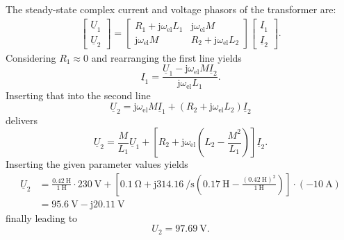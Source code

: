 \begin{solutionblock}
    The steady-state complex current and voltage phasors of the transformer are:
    \begin{align*}
			 \begin{bmatrix} \underline{U}_1 \\ \underline{U}_2 \end{bmatrix} =  \begin{bmatrix} R_1 + \mathrm{j} \omega_\mathrm{el} L_1 & \mathrm{j} \omega_\mathrm{el} M \\ \mathrm{j} \omega_\mathrm{el} M & R_2 + \mathrm{j}\omega_\mathrm{el} L_2 \end{bmatrix} \begin{bmatrix} \underline{I}_1 \\ \underline{I}_2 \end{bmatrix}.
		\end{align*}
    Considering $R_1\approx 0$ and rearranging the first line yields
    $$
    \underline{I}_1 = \frac{\underline{U}_1 - \mathrm{j} \omega_\mathrm{el} M \underline{I}_2}{\mathrm{j} \omega_\mathrm{el} L_1}. 
    $$
    Inserting that into the second line
    $$
    \underline{U}_2 = \mathrm{j} \omega_\mathrm{el} M \underline{I}_1 + (R_2 + \mathrm{j}\omega_\mathrm{el} L_2)\underline{I}_2 
    $$
    delivers
    $$
    \underline{U}_2 = \frac{M}{L_1}\underline{U}_1 + \left[R_2 + \mathrm{j}\omega_\mathrm{el}\left( L_2-\frac{M^2}{L_1}\right)\right]\underline{I}_2.
    $$
    Inserting the given parameter values yields
    \begin{align*}
    \underline{U}_2 &= \frac{\SI{0.42}{\henry}}{\SI{1}{\henry}}\cdot\SI{230}{\volt} + \left[\SI{0.1}{\ohm} + \mathrm{j}\SI{314.16}{\per\second}\left( \SI{0.17}{\henry}-\frac{(\SI{0.42}{\henry})^2}{\SI{1}{\henry}}\right)\right]\cdot(\SI{-10}{\ampere})\\
     &= \SI{95.6}{\volt} - \mathrm{j} \SI{20.11}{\volt}
    \end{align*}
    finally leading to
    $$
    U_2 = \SI{97.69}{\volt}.
    $$
\end{solutionblock}


